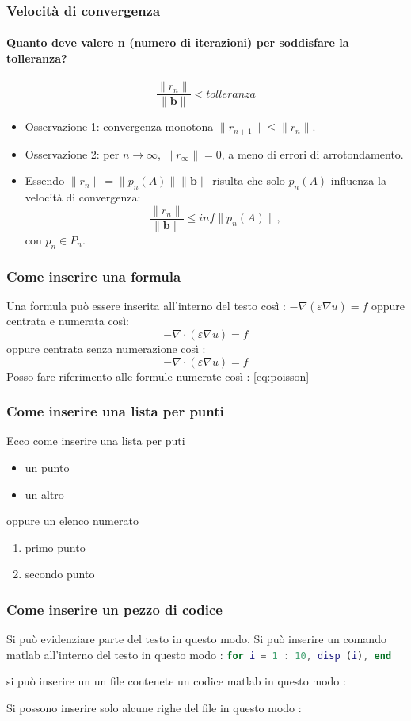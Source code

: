 \documentclass[10pt]{beamer}
\begin{document}
\begin{frame} \frametitle{Velocità di convergenza}\framesubtitle{Quanto deve valere \textbf{n} (numero di iterazioni) per soddisfare la tolleranza?}
    $$ \frac{\|r_n\|}{\|\mathbf{b}\|}  < tolleranza$$
\begin{itemize}
    \item Osservazione 1: convergenza monotona $\|r_{n+1}\|\leq \|r_n\|$.
    \item Osservazione 2: per $n\to \infty$, $\|r_{\infty} \|= 0$, a meno di errori di arrotondamento.
    
    \item Essendo $\|r_n\| = \|p_n(A)\|\|\mathbf{b}\|$ risulta che solo $p_n(A)$ influenza la velocità di convergenza: $$\frac{\|r_n\|}{\|\mathbf{b}\|} \leq inf\|p_n(A)\|,$$ con $p_n \in P_n$.

\end{itemize}
\end{frame}


\begin{frame} \frametitle{Come inserire una formula}
Una formula può essere inserita all'interno del testo così : 
$-\nabla \left( \varepsilon \nabla u \right) = f $ oppure 
centrata e numerata così:
\begin{equation}\label{eq:poisson}
    -\nabla \cdot \left( \varepsilon \nabla u \right) = f
\end{equation}
oppure centrata senza numerazione così :
$$
 -\nabla \cdot \left( \varepsilon \nabla u \right) = f
$$
Posso fare riferimento alle formule numerate così : \eqref{eq:poisson}
\end{frame}

\begin{frame} \frametitle{Come inserire una lista per punti}
Ecco come inserire una lista per puti
\begin{itemize}
    \item un punto
    \item un altro
\end{itemize}
oppure un elenco numerato
\begin{enumerate}
    \item primo punto
    \item secondo punto
\end{enumerate}

\end{frame}



\begin{frame} \frametitle{Come inserire un pezzo di codice}
Si può evidenziare \alert{parte del testo} in questo modo.
%
Si può inserire un comando matlab all'interno del testo
in questo modo : \lstinline[language=Matlab]{for i = 1 : 10, disp (i), end}

si può inserire un un file contenete un codice matlab in questo modo :


Si possono inserire solo alcune righe del file in questo modo :


\end{frame}
\end{document}
